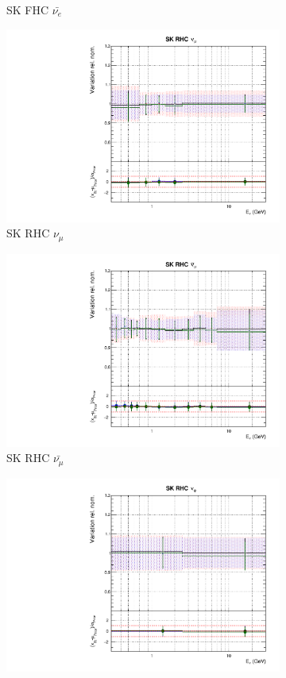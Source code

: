 \begin{figure}[!htbp]
\begin{subfigure}{0.45\textwidth}
  \caption{SK FHC $\bar{\nu_{e}}$}
\end{subfigure}
\begin{subfigure}{0.45\textwidth}
  \centering
  \includegraphics[width=0.75\linewidth]{figs/polyasmvsflux_12}
  \caption{SK RHC $\nu_{\mu}$}
\end{subfigure}
\begin{subfigure}{0.45\textwidth}
  \centering
  \includegraphics[width=0.75\linewidth]{figs/polyasmvsflux_13}
  \caption{SK RHC $\bar{\nu_{\mu}}$}
\end{subfigure}
\begin{subfigure}{0.45\textwidth}
  \centering
  \includegraphics[width=0.75\linewidth]{figs/polyasmvsflux_14}

\end{subfigure}
\end{figure}
